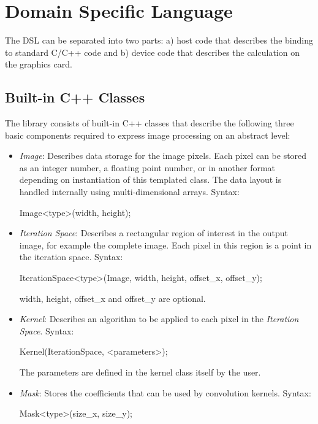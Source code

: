 \section{Domain Specific Language}
The \ac{DSL} can be separated into two parts: a) host code that describes the binding to standard C/C++ code and b) device code that describes the calculation on the graphics card.


\subsection{Built-in C++ Classes}\label{sec:framework_classes}
The library consists of built-in C++ classes that describe the following three basic components required to express image processing on an abstract level:
\begin{itemize}
    \item {\em Image}:
    Describes data storage for the image pixels. Each pixel can be stored as an
    integer number, a floating point number, or in another format depending on
    instantiation of this templated class. The data layout is handled internally
    using multi-dimensional arrays. Syntax:\\
\begin{code}
Image<type>(width, height);
\end{code}

    \item {\em Iteration Space}:
    Describes a rectangular region of interest in the output image, for example
    the complete image. Each pixel in this region is a point in the iteration
    space. Syntax:\\
\begin{code}
IterationSpace<type>(Image, width, height, offset_x, offset_y);
\end{code}
    width, height, offset\_x and offset\_y are optional.

    \item {\em Kernel}:
    Describes an algorithm to be applied to each pixel in the {\em Iteration
    Space}. Syntax:\\
\begin{code}
Kernel(IterationSpace, <parameters>);
\end{code}
    The parameters are defined in the kernel class itself by the user.

    \item {\em Mask}:
    Stores the coefficients that can be used by convolution kernels. Syntax:
\begin{code}
Mask<type>(size_x, size_y);
\end{code}


\end{itemize}
